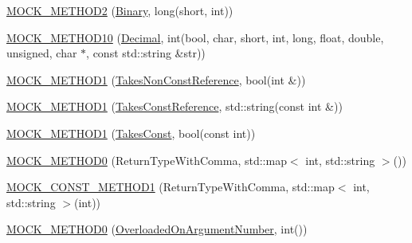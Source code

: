 \begin{DoxyCompactItemize}
\mbox{\hyperlink{classtesting_1_1gmock__generated__function__mockers__test_1_1_mock_foo_a50f8c94d6fab258d49e1d4a15ea7a7af}{M\+O\+C\+K\+\_\+\+M\+E\+T\+H\+O\+D2}} (\mbox{\hyperlink{classtesting_1_1gmock__generated__function__mockers__test_1_1_foo_interface_a59ea28b711ece054ce9d57c2dc574ba0}{Binary}}, long(short, int))
\item 
\mbox{\hyperlink{classtesting_1_1gmock__generated__function__mockers__test_1_1_mock_foo_ab0a37a844eb43c36ca45cff5274bd9e9}{M\+O\+C\+K\+\_\+\+M\+E\+T\+H\+O\+D10}} (\mbox{\hyperlink{classtesting_1_1gmock__generated__function__mockers__test_1_1_foo_interface_a5a389017205848c7b7055c071cca0c6d}{Decimal}}, int(bool, char, short, int, long, float, double, unsigned, char $\ast$, const std\+::string \&str))
\item 
\mbox{\hyperlink{classtesting_1_1gmock__generated__function__mockers__test_1_1_mock_foo_a785cbef820189a974170cea52b0d97d9}{M\+O\+C\+K\+\_\+\+M\+E\+T\+H\+O\+D1}} (\mbox{\hyperlink{classtesting_1_1gmock__generated__function__mockers__test_1_1_foo_interface_a694354adfffcee58093298bc12182ff5}{Takes\+Non\+Const\+Reference}}, bool(int \&))
\item 
\mbox{\hyperlink{classtesting_1_1gmock__generated__function__mockers__test_1_1_mock_foo_a94d9e3801000de6dec4b4394a12a9349}{M\+O\+C\+K\+\_\+\+M\+E\+T\+H\+O\+D1}} (\mbox{\hyperlink{classtesting_1_1gmock__generated__function__mockers__test_1_1_foo_interface_aae85be7a3d1b53625fbeeac4694292d3}{Takes\+Const\+Reference}}, std\+::string(const int \&))
\item 
\mbox{\hyperlink{classtesting_1_1gmock__generated__function__mockers__test_1_1_mock_foo_a7b548776b156454bcddecaca6294c52f}{M\+O\+C\+K\+\_\+\+M\+E\+T\+H\+O\+D1}} (\mbox{\hyperlink{classtesting_1_1gmock__generated__function__mockers__test_1_1_foo_interface_a8c53e87edf0b9da878e5259f02b7f5dc}{Takes\+Const}}, bool(const int))
\item 
\mbox{\hyperlink{classtesting_1_1gmock__generated__function__mockers__test_1_1_mock_foo_adda63f3a046fadc9ad44731240d441e2}{M\+O\+C\+K\+\_\+\+M\+E\+T\+H\+O\+D0}} (Return\+Type\+With\+Comma, std\+::map$<$ int, std\+::string $>$())
\item 
\mbox{\hyperlink{classtesting_1_1gmock__generated__function__mockers__test_1_1_mock_foo_a921e9d77c56ab58ef3881de92ffa3ae0}{M\+O\+C\+K\+\_\+\+C\+O\+N\+S\+T\+\_\+\+M\+E\+T\+H\+O\+D1}} (Return\+Type\+With\+Comma, std\+::map$<$ int, std\+::string $>$(int))
\item 
\mbox{\hyperlink{classtesting_1_1gmock__generated__function__mockers__test_1_1_mock_foo_a1666c565d1b48b351a1a453f6f87ff22}{M\+O\+C\+K\+\_\+\+M\+E\+T\+H\+O\+D0}} (\mbox{\hyperlink{classtesting_1_1gmock__generated__function__mockers__test_1_1_foo_interface_ae9e86ac64fa9acedfb1fa747174c7f43}{Overloaded\+On\+Argument\+Number}}, int())

\end{DoxyCompactItemize}
